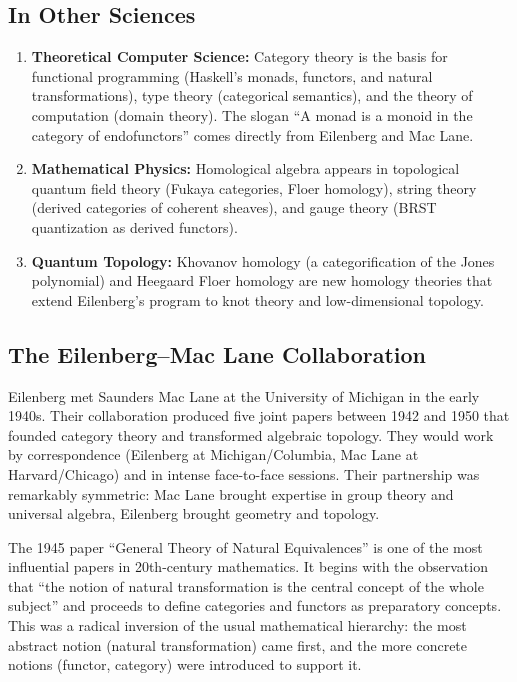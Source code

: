 \subsection{In Other Sciences}

\begin{enumerate}
    \item \textbf{Theoretical Computer Science:} Category theory is the basis for functional programming (Haskell's monads, functors, and natural transformations), type theory (categorical semantics), and the theory of computation (domain theory). The slogan ``A monad is a monoid in the category of endofunctors'' comes directly from Eilenberg and Mac Lane.
    
    \item \textbf{Mathematical Physics:} Homological algebra appears in topological quantum field theory (Fukaya categories, Floer homology), string theory (derived categories of coherent sheaves), and gauge theory (BRST quantization as derived functors).
    
    \item \textbf{Quantum Topology:} Khovanov homology (a categorification of the Jones polynomial) and Heegaard Floer homology are new homology theories that extend Eilenberg's program to knot theory and low-dimensional topology.
\end{enumerate}

\subsection{The Eilenberg--Mac Lane Collaboration}

Eilenberg met Saunders Mac Lane at the University of Michigan in the early 1940s. Their collaboration produced five joint papers between 1942 and 1950 that founded category theory and transformed algebraic topology. They would work by correspondence (Eilenberg at Michigan/Columbia, Mac Lane at Harvard/Chicago) and in intense face-to-face sessions. Their partnership was remarkably symmetric: Mac Lane brought expertise in group theory and universal algebra, Eilenberg brought geometry and topology.

The 1945 paper ``General Theory of Natural Equivalences'' is one of the most influential papers in 20th-century mathematics. It begins with the observation that ``the notion of natural transformation is the central concept of the whole subject'' and proceeds to define categories and functors as preparatory concepts. This was a radical inversion of the usual mathematical hierarchy: the most abstract notion (natural transformation) came first, and the more concrete notions (functor, category) were introduced to support it.

